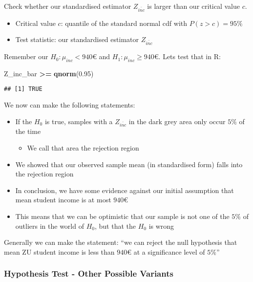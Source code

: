 \documentclass[]{article}
\newenvironment{Shaded}{\begin{snugshade}}{\end{snugshade}}
\newcommand{\KeywordTok}[1]{\textcolor[rgb]{0.13,0.29,0.53}{\textbf{#1}}}
\newcommand{\FloatTok}[1]{\textcolor[rgb]{0.00,0.00,0.81}{#1}}
\newcommand{\StringTok}[1]{\textcolor[rgb]{0.31,0.60,0.02}{#1}}
\newcommand{\OperatorTok}[1]{\textcolor[rgb]{0.81,0.36,0.00}{\textbf{#1}}}
\newcommand{\NormalTok}[1]{#1}
\providecommand{\tightlist}{%
  \setlength{\itemsep}{0pt}\setlength{\parskip}{0pt}}
\begin{document}
Check whether our standardised estimator \(Z_{\bar{inc}}\) is larger
than our critical value \(c\).

\begin{itemize}
\tightlist
\item
  Critical value \(c\): quantile of the standard normal cdf with
  \(P(z > c) = 95 \%\)
\item
  Test statistic: our standardised estimator \(Z_{\bar{inc}}\)
\end{itemize}

Remember our \(H_0: \mu_{inc} < 940€\) and \(H_1: \mu_{inc} \geq 940€\).
Lets test that in R:

\begin{Shaded}
\begin{Highlighting}[]
\NormalTok{Z_inc_bar }\OperatorTok{>=}\StringTok{ }\KeywordTok{qnorm}\NormalTok{(}\FloatTok{0.95}\NormalTok{)}
\end{Highlighting}
\end{Shaded}

\begin{verbatim}
## [1] TRUE
\end{verbatim}

We now can make the following statements:

\begin{itemize}
\tightlist
\item
  If the \(H_0\) is true, samples with a \(Z_\bar{inc}\) in the dark
  grey area only occur \(5\%\) of the time

  \begin{itemize}
  \tightlist
  \item
    We call that area the rejection region
  \end{itemize}
\item
  We showed that our observed sample mean (in standardised form) falls
  into the rejection region
\item
  In conclusion, we have some evidence against our initial assumption
  that mean student income is at most \(940 €\)
\item
  This means that we can be optimistic that our sample is not one of the
  \(5 \%\) of outliers in the world of \(H_0\), but that the \(H_0\) is
  wrong
\end{itemize}

Generally we can make the statement: ``we can reject the null hypothesis
that mean ZU student income is less than \(940€\) at a significance
level of \(5\%\)''

\subsubsection{Hypothesis Test - Other Possible
Variants}\label{hypothesis-test---other-possible-variants}
\end{document}
